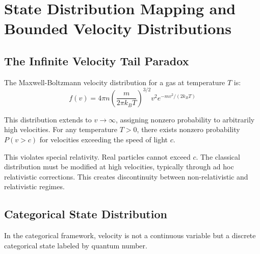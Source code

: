\section{State Distribution Mapping and Bounded Velocity Distributions}
\label{sec:state_distribution}

\subsection{The Infinite Velocity Tail Paradox}

The Maxwell-Boltzmann velocity distribution for a gas at temperature $T$ is:
\begin{equation}
f(v) = 4\pi n \left(\frac{m}{2\pi k_B T}\right)^{3/2} v^2 e^{-mv^2/(2k_BT)}
\end{equation}

This distribution extends to $v \to \infty$, assigning nonzero probability to arbitrarily high velocities. For any temperature $T > 0$, there exists nonzero probability $P(v > c)$ for velocities exceeding the speed of light $c$.

This violates special relativity. Real particles cannot exceed $c$. The classical distribution must be modified at high velocities, typically through ad hoc relativistic corrections. This creates discontinuity between non-relativistic and relativistic regimes.

\subsection{Categorical State Distribution}

In the categorical framework, velocity is not a continuous variable but a discrete categorical state labeled by quantum number.

